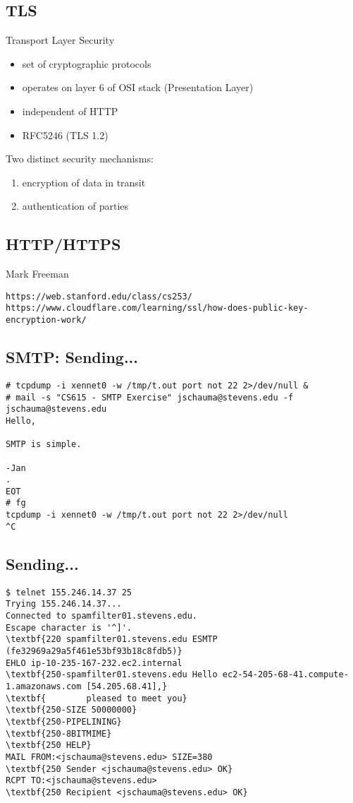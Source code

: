 \documentclass[xga]{xdvislides}
\begin{document}
\subsection{TLS}
Transport Layer Security
\begin{itemize}
	\item set of cryptographic protocols
	\item operates on layer 6 of OSI stack (Presentation Layer)
	\item independent of HTTP
	\item RFC5246 (TLS 1.2)
\end{itemize}
\addvspace{.5in}
Two distinct security mechanisms:
\begin{enumerate}
	\item encryption of data in transit
	\item authentication of parties
\end{enumerate}

\subsection{HTTP/HTTPS}
Mark Freeman\\
\vspace{1in}

\verb+https://web.stanford.edu/class/cs253/+ \\
\verb+https://www.cloudflare.com/learning/ssl/how-does-public-key-encryption-work/+


\subsection{SMTP: Sending...}
\begin{verbatim}
# tcpdump -i xennet0 -w /tmp/t.out port not 22 2>/dev/null &
# mail -s "CS615 - SMTP Exercise" jschauma@stevens.edu -f jschauma@stevens.edu
Hello,

SMTP is simple.

-Jan
.
EOT
# fg
tcpdump -i xennet0 -w /tmp/t.out port not 22 2>/dev/null
^C
\end{verbatim}

\subsection{Sending...}
\begin{Verbatim}
$ telnet 155.246.14.37 25
Trying 155.246.14.37...
Connected to spamfilter01.stevens.edu.
Escape character is '^]'.
\textbf{220 spamfilter01.stevens.edu ESMTP (fe32969a29a5f461e53bf93b18c8fdb5)}
EHLO ip-10-235-167-232.ec2.internal
\textbf{250-spamfilter01.stevens.edu Hello ec2-54-205-68-41.compute-1.amazonaws.com [54.205.68.41],}
\textbf{        pleased to meet you}
\textbf{250-SIZE 50000000}
\textbf{250-PIPELINING}
\textbf{250-8BITMIME}
\textbf{250 HELP}
MAIL FROM:<jschauma@stevens.edu> SIZE=380
\textbf{250 Sender <jschauma@stevens.edu> OK}
RCPT TO:<jschauma@stevens.edu>
\textbf{250 Recipient <jschauma@stevens.edu> OK}
\end{Verbatim}
\end{document}
